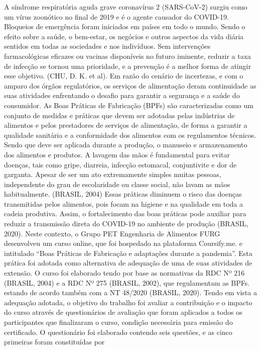 A síndrome respiratória aguda grave coronavírus 2 (SARS-CoV-2) surgiu como um vírus 
zoonótico no final de 2019 e é o agente causador do COVID-19. Bloqueios de emergência foram 
iniciados em países em todo o mundo. Sendo o efeito sobre a saúde, o bem-estar, os negócios e 
outros aspectos da vida diária sentidos em todas as sociedades e nos indivíduos. Sem intervenções 
farmacológicas eficazes ou vacinas disponíveis no futuro iminente, reduzir a taxa de infecção se
tornou uma prioridade, e a prevenção é a melhor forma de atingir esse objetivo. (CHU, D. K. et 
al). Em razão do cenário de incertezas, e com o amparo dos órgãos regulatórios, os serviços de 
alimentação deram continuidade as suas atividades enfrentando o desafio para garantir a segurança 
e a saúde do consumidor.
As Boas Práticas de Fabricação (BPFs) são caracterizadas como um conjunto de medidas e práticas 
que devem ser adotadas pelas indústrias de alimentos e pelos prestadores de serviços de 
alimentação, de forma a garantir a qualidade sanitária e a conformidade dos alimentos com os 
regulamentos técnicos. Sendo que deve ser aplicada durante a produção, o manuseio e 
armazenamento dos alimentos e produtos. A lavagem das mãos é fundamental para evitar doenças, 
tais como gripe, diarreia, infecção estomacal, conjuntivite e dor de garganta. Apesar de ser um ato 
extremamente simples muitas pessoas, independente do grau de escolaridade ou classe social, não 
lavam as mãos habitualmente. (BRASIL, 2004)
Essas práticas diminuem o risco das doenças transmitidas pelos alimentos, pois focam na higiene 
e na qualidade em toda a cadeia produtiva. Assim, o fortalecimento das boas práticas pode auxiliar 
para reduzir a transmissão direta do COVID-19 no ambiente de produção (BRASIL, 2020).
Neste contexto, o Grupo PET Engenharia de Alimentos FURG desenvolveu um curso online, que 
foi hospedado na plataforma Coursify.me. e intitulado “Boas Práticas de Fabricação e adaptações 
durante a pandemia”. Esta prática foi adotada como alternativa de adequação de uma de suas 
atividades de extensão. O curso foi elaborado tendo por base as normativas da RDC Nº 216 
(BRASIL, 2004) e a RDC Nº 275 (BRASIL, 2002), que regulamentam as BPFs. estando de acordo 
também com a NT 48/2020 (BRASIL, 2020).
Tendo em vista a adequação adotada, o objetivo do trabalho foi avaliar a contribuição e o impacto 
do curso através de questionários de avaliação que foram aplicados a todos os participantes que 
finalizaram o curso, condição necessária para emissão do certificado.
O questionário foi elaborado contendo seis questões, e as cinco primeiras foram constituídas por 
